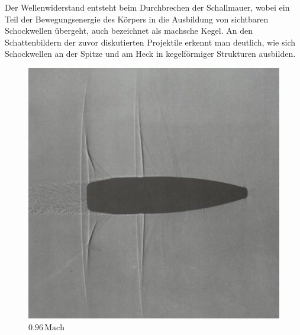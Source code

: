 Der Wellenwiderstand entsteht beim Durchbrechen 
der Schallmauer, wobei ein Teil der Bewegungsenergie 
des Körpers in die Ausbildung von sichtbaren Schockwellen übergeht,
auch bezeichnet als machsche Kegel.
An den Schattenbildern der zuvor diskutierten Projektile 
erkennt man deutlich,
wie sich Schockwellen an der Spitze und am Heck 
in kegelförmiger Strukturen ausbilden.
\begin{figure}
    \centering
    \begin{minipage}[b]{0.32\textwidth}
        \centering
        \includegraphics[width=\linewidth]{papers/ueberschall/figures/0.96_mach_projektil.jpg}
        \caption*{$0.96\,\mathrm{Mach}$}
    \end{minipage}
    \hfill
    \begin{minipage}[b]{0.32\textwidth}
        \centering

\end{minipage}
\end{figure}
